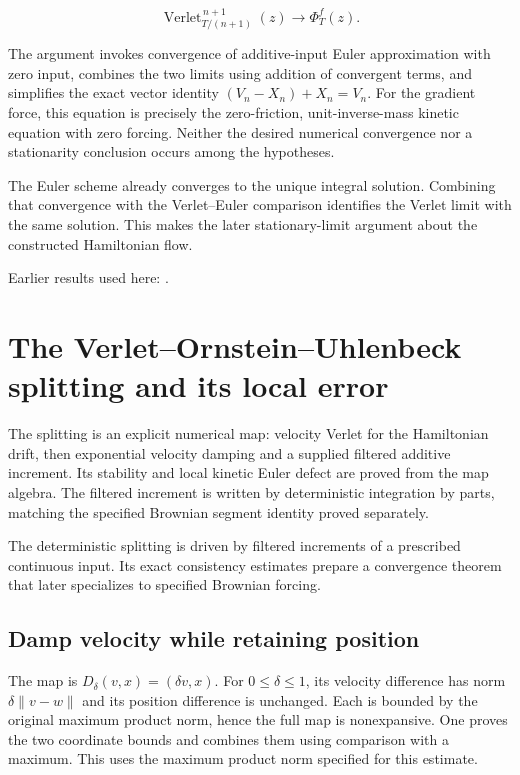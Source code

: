 \documentclass[11pt,a4paper]{report}
\begin{document}
\[\operatorname{Verlet}_{T/(n+1)}^{\,n+1}(z)\longrightarrow\Phi_T^f(z).\]

The argument invokes convergence of additive-input Euler approximation with zero input, combines the two limits using addition of convergent terms, and simplifies the exact vector identity \((V_n-X_n)+X_n=V_n\). For the gradient force, this equation is precisely the zero-friction, unit-inverse-mass kinetic equation with zero forcing. Neither the desired numerical convergence nor a stationarity conclusion occurs among the hypotheses.



The Euler scheme already converges to the unique integral solution. Combining that convergence with the Verlet–Euler comparison identifies the Verlet limit with the same solution. This makes the later stationary-limit argument about the constructed Hamiltonian flow.



Earlier results used here: \cite[Section~3.16.8]{LangevinLean2026ULASC}.
\section{\texorpdfstring{The Verlet–Ornstein–Uhlenbeck splitting and its local error}{The Verlet–Ornstein–Uhlenbeck splitting and its local error}}
\label{proof-module-KineticLangevin-KineticSplitting-lean}


The splitting is an explicit numerical map: velocity Verlet for the Hamiltonian drift, then exponential velocity damping and a supplied filtered additive increment. Its stability and local kinetic Euler defect are proved from the map algebra. The filtered increment is written by deterministic integration by parts, matching the specified Brownian segment identity proved separately.



The deterministic splitting is driven by filtered increments of a prescribed continuous input. Its exact consistency estimates prepare a convergence theorem that later specializes to specified Brownian forcing.

\subsection{\texorpdfstring{Damp velocity while retaining position}{Damp velocity while retaining position}}
\label{report-step-KineticLangevin-KineticSplitting-lean-1}


The map is \(D_\delta(v,x)=(\delta v,x)\). For \(0\le\delta\le1\), its velocity difference has norm \(\delta\|v-w\|\) and its position difference is unchanged. Each is bounded by the original maximum product norm, hence the full map is nonexpansive. One proves the two coordinate bounds and combines them using comparison with a maximum. This uses the maximum product norm specified for this estimate.
\end{document}
